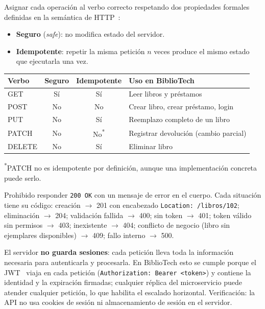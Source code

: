 \documentclass[11pt,a4paper]{article}
\begin{document}
\begin{cajapaso}
Asignar cada operación al verbo correcto respetando dos propiedades formales definidas en la semántica de HTTP~\cite{rfc9110}:
\begin{itemize}
  \item \textbf{Seguro} (\textit{safe}): no modifica estado del servidor.
  \item \textbf{Idempotente}: repetir la misma petición $n$ veces produce el mismo estado que ejecutarla una vez.
\end{itemize}

\begin{center}
\small
\begin{tabular}{l c c p{6.8cm}}
\toprule
\textbf{Verbo} & \textbf{Seguro} & \textbf{Idempotente} & \textbf{Uso en BiblioTech} \\
\midrule
GET & Sí & Sí & Leer libros y préstamos \\
POST & No & No & Crear libro, crear préstamo, login \\
PUT & No & Sí & Reemplazo completo de un libro \\
PATCH & No & No\textsuperscript{*} & Registrar devolución (cambio parcial) \\
DELETE & No & Sí & Eliminar libro \\
\bottomrule
\end{tabular}

{\scriptsize\textsuperscript{*}PATCH no es idempotente por definición, aunque una implementación concreta puede serlo.}
\end{center}
\end{cajapaso}

\begin{cajapaso}
Prohibido responder \texttt{200 OK} con un mensaje de error en el cuerpo. Cada situación tiene su código: creación $\rightarrow$ 201 con encabezado \texttt{Location: /libros/102}; eliminación $\rightarrow$ 204; validación fallida $\rightarrow$ 400; sin token $\rightarrow$ 401; token válido sin permisos $\rightarrow$ 403; inexistente $\rightarrow$ 404; conflicto de negocio (libro sin ejemplares disponibles) $\rightarrow$ 409; fallo interno $\rightarrow$ 500.
\end{cajapaso}

\begin{cajapaso}
El servidor \textbf{no guarda sesiones}: cada petición lleva toda la información necesaria para autenticarla y procesarla. En BiblioTech esto se cumple porque el JWT~\cite{rfc7519} viaja en cada petición (\texttt{Authorization: Bearer <token>}) y contiene la identidad y la expiración firmadas; cualquier réplica del microservicio puede atender cualquier petición, lo que habilita el escalado horizontal. Verificación: la API no usa cookies de sesión ni almacenamiento de sesión en el servidor.
\end{cajapaso}
\end{document}
